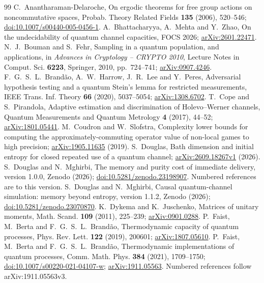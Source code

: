 \documentclass[11pt]{article}
\theoremstyle{definition}
\theoremstyle{remark}
\begin{document}
\begin{thebibliography}{99}
 C.~Anantharaman-Delaroche, On ergodic theorems for free group actions on noncommutative spaces, Probab. Theory Related Fields \textbf{135} (2006), 520--546; \href{https://doi.org/10.1007/s00440-005-0456-1}{doi:10.1007/s00440-005-0456-1}.
 A.~Bhattacharyya, A.~Mehta and Y.~Zhao, On the undecidability of quantum channel capacities, FOCS 2026; \href{https://arxiv.org/abs/2601.22471}{arXiv:2601.22471}.
 N.~J.~Bouman and S.~Fehr, Sampling in a quantum population, and applications, in \emph{Advances in Cryptology -- CRYPTO 2010}, Lecture Notes in Comput. Sci. \textbf{6223}, Springer, 2010, pp.~724--741; \href{https://arxiv.org/abs/0907.4246}{arXiv:0907.4246}.
 F.~G.~S.~L.~Brand\~ao, A.~W.~Harrow, J.~R.~Lee and Y.~Peres, Adversarial hypothesis testing and a quantum Stein's lemma for restricted measurements, IEEE Trans. Inf. Theory \textbf{66} (2020), 5037--5054; \href{https://arxiv.org/abs/1308.6702}{arXiv:1308.6702}.
 T.~Cope and S.~Pirandola, Adaptive estimation and discrimination of Holevo--Werner channels, Quantum Measurements and Quantum Metrology \textbf{4} (2017), 44--52; \href{https://arxiv.org/abs/1801.05441}{arXiv:1801.05441}.
 M.~Coudron and W.~Slofstra, Complexity lower bounds for computing the approximately-commuting operator value of non-local games to high precision; \href{https://arxiv.org/abs/1905.11635}{arXiv:1905.11635} (2019).
 S.~Douglas, Bath dimension and initial entropy for closed repeated use of a quantum channel; \href{https://arxiv.org/abs/2609.18267v1}{arXiv:2609.18267v1} (2026).
 S.~Douglas and N.~Mghirbi, The memory and purity cost of immediate delivery, version 1.0.0, Zenodo (2026); \href{https://doi.org/10.5281/zenodo.23198907}{doi:10.5281/zenodo.23198907}. Numbered references are to this version.
 S.~Douglas and N.~Mghirbi, Causal quantum-channel simulation: memory beyond entropy, version 1.1.2, Zenodo (2026); \href{https://doi.org/10.5281/zenodo.23070870}{doi:10.5281/zenodo.23070870}.
 K.~Dykema and K.~Juschenko, Matrices of unitary moments, Math. Scand. \textbf{109} (2011), 225--239; \href{https://arxiv.org/abs/0901.0288}{arXiv:0901.0288}.
 P.~Faist, M.~Berta and F.~G.~S.~L.~Brand\~ao, Thermodynamic capacity of quantum processes, Phys. Rev. Lett. \textbf{122} (2019), 200601; \href{https://arxiv.org/abs/1807.05610}{arXiv:1807.05610}.
 P.~Faist, M.~Berta and F.~G.~S.~L.~Brand\~ao, Thermodynamic implementations of quantum processes, Comm. Math. Phys. \textbf{384} (2021), 1709--1750; \href{https://doi.org/10.1007/s00220-021-04107-w}{doi:10.1007/s00220-021-04107-w}; \href{https://arxiv.org/abs/1911.05563}{arXiv:1911.05563}. Numbered references follow arXiv:1911.05563v3.

\end{thebibliography}
\end{document}
